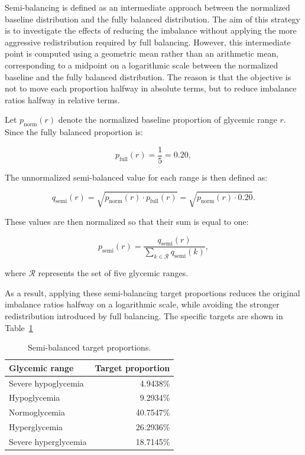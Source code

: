 Semi-balancing is defined as an intermediate approach between the normalized baseline distribution and the fully balanced distribution. The aim of this strategy is to investigate the effects of reducing the imbalance without applying the more aggressive redistribution required by full balancing. However, this intermediate point is computed using a geometric mean rather than an arithmetic mean, corresponding to a midpoint on a logarithmic scale between the normalized baseline and the fully balanced distribution. The reason is that the objective is not to move each proportion halfway in absolute terms, but to reduce imbalance ratios halfway in relative terms.

Let \(p_{\mathrm{norm}}(r)\) denote the normalized baseline proportion of glycemic range \(r\). Since the fully balanced proportion is:

\[
p_{\mathrm{full}}(r)=\frac{1}{5}=0.20,
\]

The unnormalized semi-balanced value for each range is then defined as:

\[
q_{\mathrm{semi}}(r)
=
\sqrt{
p_{\mathrm{norm}}(r)
\cdot
p_{\mathrm{full}}(r)
}
=
\sqrt{
p_{\mathrm{norm}}(r)
\cdot 0.20
}.
\]

These values are then normalized so that their sum is equal to one:

\[
p_{\mathrm{semi}}(r)
=
\frac{
q_{\mathrm{semi}}(r)
}{
\displaystyle\sum_{k \in \mathcal{R}} q_{\mathrm{semi}}(k)
},
\]

where \(\mathcal{R}\) represents the set of five glycemic ranges.

As a result, applying these semi-balancing target proportions reduces the original imbalance ratios halfway on a logarithmic scale, while avoiding the stronger redistribution introduced by full balancing. The specific targets are shown in Table~\ref{tab:semi_balanced_target_proportions}

\begin{table}[htbp]
    \centering
    \caption{Semi-balanced target proportions.}
    \label{tab:semi_balanced_target_proportions}
    \begin{tabular}{lr}
        \hline
        \textbf{Glycemic range} & \textbf{Target proportion} \\
        \hline
        Severe hypoglycemia & 4.9438\% \\
        Hypoglycemia & 9.2934\% \\
        Normoglycemia & 40.7547\% \\
        Hyperglycemia & 26.2936\% \\
        Severe hyperglycemia & 18.7145\% \\
        \hline
    \end{tabular}
\end{table}

